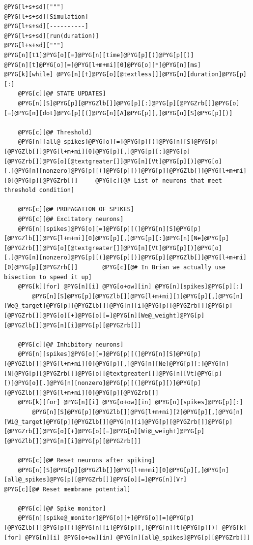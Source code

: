 \documentclass[letterpaper,10pt,english]{manual}
\begin{document}
\begin{Verbatim}[commandchars=@\[\]]
@PYG[l+s+sd]["""]
@PYG[l+s+sd][Simulation]
@PYG[l+s+sd][----------]
@PYG[l+s+sd][run(duration)]
@PYG[l+s+sd]["""]
@PYG[n][t1]@PYG[o][=]@PYG[n][time]@PYG[p][(]@PYG[p][)]
@PYG[n][t]@PYG[o][=]@PYG[l+m+mi][0]@PYG[o][*]@PYG[n][ms]
@PYG[k][while] @PYG[n][t]@PYG[o][@textless[]]@PYG[n][duration]@PYG[p][:]
    @PYG[c][@# STATE UPDATES]
    @PYG[n][S]@PYG[p][@PYGZlb[]]@PYG[p][:]@PYG[p][@PYGZrb[]]@PYG[o][=]@PYG[n][dot]@PYG[p][(]@PYG[n][A]@PYG[p][,]@PYG[n][S]@PYG[p][)]

    @PYG[c][@# Threshold]
    @PYG[n][all@_spikes]@PYG[o][=]@PYG[p][(]@PYG[n][S]@PYG[p][@PYGZlb[]]@PYG[l+m+mi][0]@PYG[p][,]@PYG[p][:]@PYG[p][@PYGZrb[]]@PYG[o][@textgreater[]]@PYG[n][Vt]@PYG[p][)]@PYG[o][.]@PYG[n][nonzero]@PYG[p][(]@PYG[p][)]@PYG[p][@PYGZlb[]]@PYG[l+m+mi][0]@PYG[p][@PYGZrb[]]     @PYG[c][@# List of neurons that meet threshold condition]

    @PYG[c][@# PROPAGATION OF SPIKES]
    @PYG[c][@# Excitatory neurons]
    @PYG[n][spikes]@PYG[o][=]@PYG[p][(]@PYG[n][S]@PYG[p][@PYGZlb[]]@PYG[l+m+mi][0]@PYG[p][,]@PYG[p][:]@PYG[n][Ne]@PYG[p][@PYGZrb[]]@PYG[o][@textgreater[]]@PYG[n][Vt]@PYG[p][)]@PYG[o][.]@PYG[n][nonzero]@PYG[p][(]@PYG[p][)]@PYG[p][@PYGZlb[]]@PYG[l+m+mi][0]@PYG[p][@PYGZrb[]]       @PYG[c][@# In Brian we actually use bisection to speed it up]
    @PYG[k][for] @PYG[n][i] @PYG[o+ow][in] @PYG[n][spikes]@PYG[p][:]
        @PYG[n][S]@PYG[p][@PYGZlb[]]@PYG[l+m+mi][1]@PYG[p][,]@PYG[n][We@_target]@PYG[p][@PYGZlb[]]@PYG[n][i]@PYG[p][@PYGZrb[]]@PYG[p][@PYGZrb[]]@PYG[o][+]@PYG[o][=]@PYG[n][We@_weight]@PYG[p][@PYGZlb[]]@PYG[n][i]@PYG[p][@PYGZrb[]]

    @PYG[c][@# Inhibitory neurons]
    @PYG[n][spikes]@PYG[o][=]@PYG[p][(]@PYG[n][S]@PYG[p][@PYGZlb[]]@PYG[l+m+mi][0]@PYG[p][,]@PYG[n][Ne]@PYG[p][:]@PYG[n][N]@PYG[p][@PYGZrb[]]@PYG[o][@textgreater[]]@PYG[n][Vt]@PYG[p][)]@PYG[o][.]@PYG[n][nonzero]@PYG[p][(]@PYG[p][)]@PYG[p][@PYGZlb[]]@PYG[l+m+mi][0]@PYG[p][@PYGZrb[]]
    @PYG[k][for] @PYG[n][i] @PYG[o+ow][in] @PYG[n][spikes]@PYG[p][:]
        @PYG[n][S]@PYG[p][@PYGZlb[]]@PYG[l+m+mi][2]@PYG[p][,]@PYG[n][Wi@_target]@PYG[p][@PYGZlb[]]@PYG[n][i]@PYG[p][@PYGZrb[]]@PYG[p][@PYGZrb[]]@PYG[o][+]@PYG[o][=]@PYG[n][Wi@_weight]@PYG[p][@PYGZlb[]]@PYG[n][i]@PYG[p][@PYGZrb[]]

    @PYG[c][@# Reset neurons after spiking]
    @PYG[n][S]@PYG[p][@PYGZlb[]]@PYG[l+m+mi][0]@PYG[p][,]@PYG[n][all@_spikes]@PYG[p][@PYGZrb[]]@PYG[o][=]@PYG[n][Vr]                       @PYG[c][@# Reset membrane potential]

    @PYG[c][@# Spike monitor]
    @PYG[n][spike@_monitor]@PYG[o][+]@PYG[o][=]@PYG[p][@PYGZlb[]]@PYG[p][(]@PYG[n][i]@PYG[p][,]@PYG[n][t]@PYG[p][)] @PYG[k][for] @PYG[n][i] @PYG[o+ow][in] @PYG[n][all@_spikes]@PYG[p][@PYGZrb[]]


\end{Verbatim}
\end{document}
